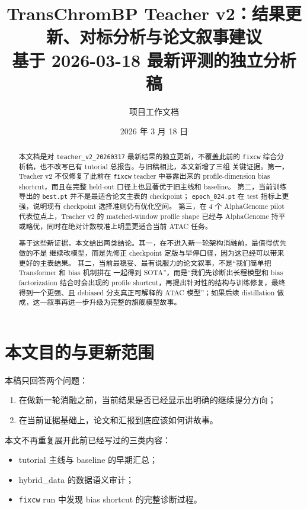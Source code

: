 \documentclass[11pt,a4paper]{ctexart}
\title{TransChromBP Teacher v2：结果更新、对标分析与论文叙事建议\\
\large 基于 2026-03-18 最新评测的独立分析稿}
\author{项目工作文档}
\date{2026 年 3 月 18 日}
\begin{document}
\maketitle

\begin{abstract}
本文档是对 \texttt{teacher\_v2\_20260317} 最新结果的独立更新，不覆盖此前的
\texttt{fixcw} 综合分析稿，也不改写已有 tutorial 总报告。与旧稿相比，本文新增了三组
关键证据。第一，Teacher v2 不仅修复了此前在 \texttt{fixcw} teacher 中暴露出来的
profile-dimension bias shortcut，而且在完整 held-out 口径上也显著优于旧主线和 baseline。
第二，当前训练导出的 \texttt{best.pt} 并不是最适合论文主表的 checkpoint；
\texttt{epoch\_024.pt} 在 test 指标上更强，说明现有 checkpoint 选择准则仍有优化空间。
第三，在 4 个 AlphaGenome pilot 代表位点上，Teacher v2 的 matched-window profile shape
已经与 AlphaGenome 持平或略优，同时在绝对计数校准上明显更适合当前 ATAC 任务。

基于这些新证据，本文给出两类结论。其一，在不进入新一轮架构消融前，最值得优先做的不是
继续改模型，而是先修正 checkpoint 定版与早停口径，因为这已经可以带来更好的主表结果。
其二，当前最稳妥、最有说服力的论文叙事，不是“我们简单把 Transformer 和 bias 机制拼在
一起得到 SOTA”，而是“我们先诊断出长程模型和 bias factorization 结合时会出现的 profile
shortcut，再提出针对性的结构与训练修复，最终得到一个更强、且 debiased 分支真正可解释的
ATAC 模型”；如果后续 distillation 做成，这一叙事再进一步升级为完整的旗舰模型故事。
\end{abstract}

\section{本文目的与更新范围}

本稿只回答两个问题：
\begin{enumerate}[leftmargin=2em]
  \item 在做新一轮消融之前，当前结果是否已经显示出明确的继续提分方向；
  \item 在当前证据基础上，论文和汇报到底应该如何讲故事。
\end{enumerate}

本文不再重复展开此前已经写过的三类内容：
\begin{itemize}[leftmargin=2em]
  \item tutorial 主线与 baseline 的早期汇总；
  \item hybrid\_data 的数据语义审计；
  \item \texttt{fixcw} run 中发现 bias shortcut 的完整诊断过程。
\end{itemize}
\end{document}
